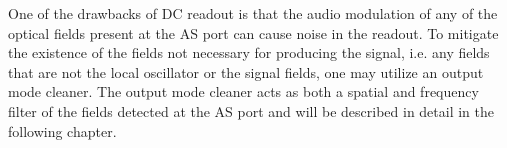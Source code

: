 One of the drawbacks of DC readout is that the audio modulation of any of the optical fields present at the AS port can cause noise in the readout. %
To mitigate the existence of the fields not necessary for producing the signal, i.e. %
any fields that are not the local oscillator or the signal fields, one may utilize an output mode cleaner. %
The output mode cleaner acts as both a spatial and frequency filter of the fields detected at the AS port and will be described in detail in the following chapter.
